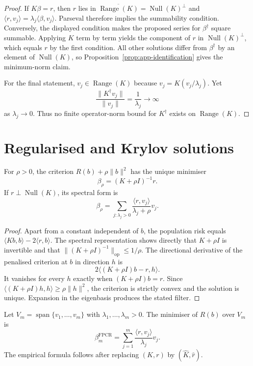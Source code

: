 \begin{proof}
If $K\beta=r$, then $r$ lies in
$\overline{\operatorname{Range}(K)}=\operatorname{Null}(K)^\perp$ and
$\langle r,v_j\rangle=\lambda_j\langle\beta,v_j\rangle$.  Parseval therefore
implies the summability condition.  Conversely, the displayed condition
makes the proposed series for $\beta^\dagger$ square summable.  Applying $K$
term by term yields the component of $r$ in
$\operatorname{Null}(K)^\perp$, which equals $r$ by the first condition.
All other solutions differ from $\beta^\dagger$ by an element of
$\operatorname{Null}(K)$, so Proposition~\ref{prop:app-identification} gives
the minimum-norm claim.

For the final statement, $v_j\in\operatorname{Range}(K)$ because
$v_j=K(v_j/\lambda_j)$.  Yet
\[
 \frac{\|K^\dagger v_j\|}{\|v_j\|}
 =\frac1{\lambda_j}\longrightarrow\infty
\]
as $\lambda_j\to0$.  Thus no finite operator-norm bound for $K^\dagger$
exists on $\operatorname{Range}(K)$.
\end{proof}

\section{Regularised and Krylov solutions}
\label{sec:app-regularisation-proofs}

\begin{proposition}
\label{prop:app-tikhonov}
For $\rho>0$, the criterion $R(b)+\rho\|b\|^2$ has the unique minimiser
\[
    \beta_\rho=(K+\rho I)^{-1}r.
\]
If $r\perp\operatorname{Null}(K)$, its spectral form is
\[
    \beta_\rho
    =\sum_{j:\lambda_j>0}
      \frac{\langle r,v_j\rangle}{\lambda_j+\rho}v_j.
\]
\end{proposition}

\begin{proof}
Apart from a constant independent of $b$, the population risk equals
$\langle Kb,b\rangle-2\langle r,b\rangle$.  The spectral representation
shows directly that $K+\rho I$ is invertible and that
$\|(K+\rho I)^{-1}\|_{\mathrm{op}}\leq1/\rho$.  The directional derivative
of the penalised criterion at $b$ in direction $h$ is
\[
 2\langle (K+\rho I)b-r,h\rangle.
\]
It vanishes for every $h$ exactly when $(K+\rho I)b=r$.  Since
$\langle (K+\rho I)h,h\rangle\geq\rho\|h\|^2$, the criterion is strictly
convex and the solution is unique.  Expansion in the eigenbasis produces the
stated filter.
\end{proof}

\begin{proposition}
\label{prop:app-fpcr}
Let $V_m=\operatorname{span}\{v_1,\ldots,v_m\}$ with
$\lambda_1,\ldots,\lambda_m>0$.  The minimiser of $R(b)$ over $V_m$ is
\[
    \beta_m^{\mathrm{FPCR}}
    =\sum_{j=1}^m
      \frac{\langle r,v_j\rangle}{\lambda_j}v_j.
\]
The empirical formula follows after replacing $(K,r)$ by
$(\widehat K,\widehat r)$.
\end{proposition}

